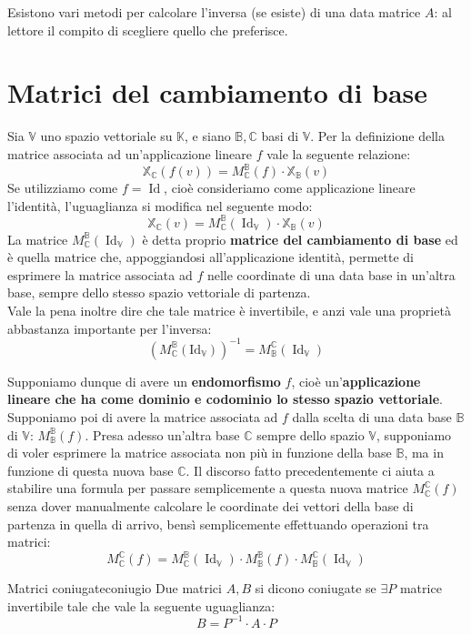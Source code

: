 \documentclass[12pt]{report}
\newcommand{\C}{\mathbb{C}}
\newcommand{\K}{\mathbb{K}}
\newcommand{\V}{\mathbb{V}}
\newcommand{\associatedmatrix}[2]{M^{\mathbb{#1}}_{\mathbb{#2}}}
\begin{document}
	Esistono vari metodi per calcolare l'inversa (se esiste) di una data matrice $A$: al lettore il compito di scegliere quello che preferisce.
	
	\section{Matrici del cambiamento di base}
	Sia $\V$ uno spazio vettoriale su $\K$, e siano $\mathbb{B}, \mathbb{C}$ basi di $\V$.
	Per la definizione della matrice associata ad un'applicazione lineare $f$ vale la seguente relazione:
	\[
		\mathbb{X}_\C(f(v)) = \associatedmatrix{B}{C}(f) \cdot \mathbb{X}_\mathbb{B}(v)
	\]
	Se utilizziamo come $f = \operatorname{Id}$, cioè consideriamo come applicazione lineare l'identità, l'uguaglianza si modifica nel seguente modo:
	\[
		\mathbb{X}_\C(v) = \associatedmatrix{B}{C}(\operatorname{Id}_\V) \cdot \mathbb{X}_\mathbb{B}(v)
	\]
	La matrice $\associatedmatrix{B}{C}(\operatorname{Id}_\V)$ è detta proprio \textbf{matrice del cambiamento di base} ed è quella matrice che, appoggiandosi all'applicazione identità, permette di esprimere la matrice associata ad $f$ nelle coordinate di una data base in un'altra base, sempre dello stesso spazio vettoriale di partenza.\\
	Vale la pena inoltre dire che tale matrice è invertibile, e anzi vale una proprietà abbastanza importante per l'inversa:
	\[
		\left(\associatedmatrix{B}{C}(\operatorname{Id_\V})\right)^{-1} = \associatedmatrix{C}{B}(\operatorname{Id}_\V)
	\]
	
	Supponiamo dunque di avere un \textbf{endomorfismo} $f$, cioè un'\textbf{applicazione lineare che ha come dominio e codominio lo stesso spazio vettoriale}. Supponiamo poi di avere la matrice associata ad $f$ dalla scelta di una data base $\mathbb{B}$ di $\V$: $\associatedmatrix{B}{B}(f)$. Presa adesso un'altra base $\C$ sempre dello spazio $\V$, supponiamo di voler esprimere la matrice associata non più in funzione della base $\mathbb{B}$, ma in funzione di questa nuova base $\C$.
	Il discorso fatto precedentemente ci aiuta a stabilire una formula per passare semplicemente a questa nuova matrice $\associatedmatrix{C}{C}(f)$ senza dover manualmente calcolare le coordinate dei vettori della base di partenza in quella di arrivo, bensì semplicemente effettuando operazioni tra matrici:
	\[
		\associatedmatrix{C}{C}(f) = \associatedmatrix{B}{C}(\operatorname{Id}_\V) \cdot \associatedmatrix{B}{B}(f) \cdot \associatedmatrix{C}{B}(\operatorname{Id}_\V)
	\]
	
	\begin{definizione}{Matrici coniugate}{coniugio}
		Due matrici $A, B$ si dicono coniugate se $\exists P$ matrice invertibile tale che vale la seguente uguaglianza:
		\[
			B = P^{-1} \cdot A \cdot P
		\]
	\end{definizione}
	
\end{document}

